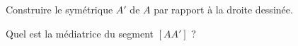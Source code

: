 
Construire le symétrique \( A'\) de \( A\) par rapport à la droite dessinée.

\begin{center}
   
\end{center}

        Quel est la médiatrice du segment \( [AA']\) ?

